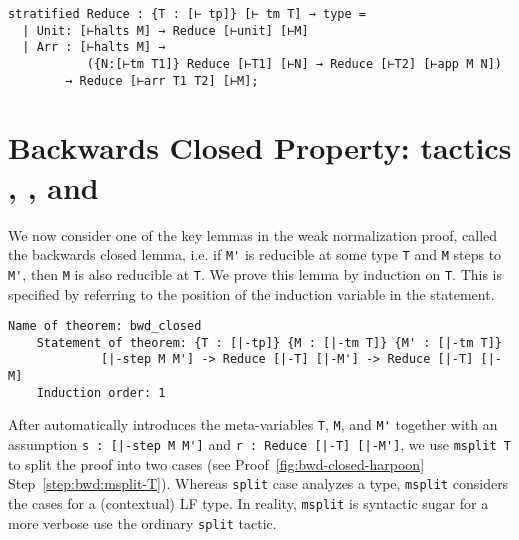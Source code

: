 \begin{lstlisting}
stratified Reduce : {T : [⊢ tp]} [⊢ tm T] → type =
  | Unit: [⊢halts M] → Reduce [⊢unit] [⊢M]
  | Arr : [⊢halts M] →
           ({N:[⊢tm T1]} Reduce [⊢T1] [⊢N] → Reduce [⊢T2] [⊢app M N])
        → Reduce [⊢arr T1 T2] [⊢M];
\end{lstlisting}




\section{%
  Backwards Closed Property: tactics \ttmsplit, \ttsuffices, and \ttby%
}



We now consider one of the key lemmas in the weak normalization proof,
called the backwards closed lemma, i.e.  if \lstinline!M'! is
reducible at some type \lstinline!T! and \lstinline!M! steps to
\lstinline!M'!, then \lstinline!M! is also reducible at \lstinline!T!.
%
We prove this lemma by induction on \lstinline!T!. This is
specified by referring to the position of the induction variable in
the statement.

\begin{lstlisting}[gobble=2, deletekeywords={of}]
    Name of theorem: bwd_closed
    Statement of theorem: {T : [|-tp]} {M : [|-tm T]} {M' : [|-tm T]}
             [|-step M M'] -> Reduce [|-T] [|-M'] -> Reduce [|-T] [|-M]
    Induction order: 1
\end{lstlisting}

%
After \Harpoon{} automatically
introduces the meta-variables \lstinline!T!, \lstinline!M!,
and \lstinline!M'! together with an assumption
\lstinline!s : [|-step M M']! and \lstinline!r : Reduce [|-T] [|-M']!,
we use \lstinline!msplit T! to split the proof into two cases (see
\Harpoon{} Proof~\ref{fig:bwd-closed-harpoon}
Step~\ref{step:bwd:msplit-T}). Whereas \lstinline!split! case analyzes
a \Beluga{} type, \lstinline!msplit! considers the cases for a
(contextual) LF type. In reality, \lstinline!msplit! is syntactic sugar for a
more verbose use the ordinary \lstinline!split! tactic.


